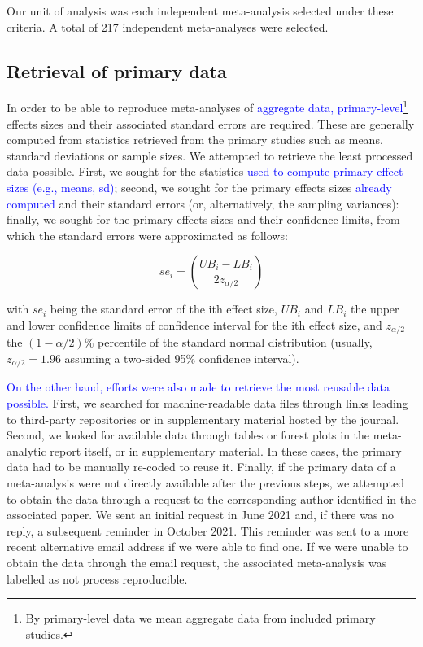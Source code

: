 \documentclass[
  ,man,floatsintext]{apa6}
\begin{document}
Our unit of analysis was each independent meta-analysis selected under these criteria. A total of 217 independent meta-analyses were selected.

\hypertarget{retrieval-of-primary-data}{%
\subsection{Retrieval of primary data}\label{retrieval-of-primary-data}}

In order to be able to reproduce meta-analyses of \textcolor{blue}{aggregate data, primary-level}\footnote{By primary-level data we mean aggregate data from included primary studies.} effects sizes and their associated standard errors are required. These are generally computed from statistics retrieved from the primary studies such as means, standard deviations or sample sizes. We attempted to retrieve the least processed data possible. First, we sought for the statistics \textcolor{blue}{used to compute primary effect sizes (e.g., means, sd)}; second, we sought for the primary effects sizes \textcolor{blue}{already computed} and their standard errors (or, alternatively, the sampling variances): finally, we sought for the primary effects sizes and their confidence limits, from which the standard errors were approximated as follows:

\[se_i = (\frac{UB_i - LB_i}{2z_{\alpha/2}})\]

with \(se_i\) being the standard error of the ith effect size, \(UB_i\) and \(LB_i\) the upper and lower confidence limits of confidence interval for the ith effect size, and \(z_{\alpha/2}\) the \((1 - {\alpha/2})\%\) percentile of the standard normal distribution (usually, \(z_{\alpha/2} = 1.96\) assuming a two-sided 95\% confidence interval).

\textcolor{blue}{On the other hand, efforts were also made to retrieve the most reusable data possible.} First, we searched for machine-readable data files through links leading to third-party repositories or in supplementary material hosted by the journal. Second, we looked for available data through tables or forest plots in the meta-analytic report itself, or in supplementary material. In these cases, the primary data had to be manually re-coded to reuse it. Finally, if the primary data of a meta-analysis were not directly available after the previous steps, we attempted to obtain the data through a request to the corresponding author identified in the associated paper. We sent an initial request in June 2021 and, if there was no reply, a subsequent reminder in October 2021. This reminder was sent to a more recent alternative email address if we were able to find one. If we were unable to obtain the data through the email request, the associated meta-analysis was labelled as not process reproducible.
\end{document}
